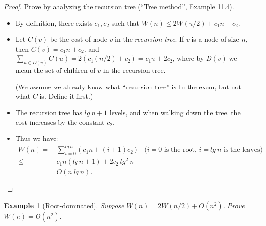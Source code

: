 \documentclass[11pt,a4paper,oneside,microtype,nokorean]{oblivoir}
\newtheorem{example}{Example}
\begin{document}
\begin{proof}
  Prove by analyzing the recursion tree (``Tree method'', Example 11.4).

  \begin{itemize}
  \item By definition, there exists $c_1,c_2$ such that $W(n) \le 2W(n/2) + c_1 n + c_2.$
  \item Let $C(v)$ be the cost of node $v$ in the \emph{recursion tree}.  If $v$ is a node of size
    $n$, then $C(v) = c_1 n + c_2$, and
    $\sum_{u \in D(v)} C(u) = 2(c_1 (n/2) + c_2) = c_1 n + 2 c_2$, where by $D(v)$ we mean the set
    of children of $v$ in the recursion tree.

    (We assume we already know what ``recursion tree'' is In the exam, but not what $C$ is.  Define
    it first.)
  \item The recursion tree has $lg~n + 1$ levels, and when walking down the tree, the cost increases
    by the constant $c_2$.
  \item Thus we have:
    \begin{align*}
      W(n)
      = &~ \sum_{i=0}^{lg~n} (c_1 n + (i+1) c_2) & \mbox{($i=0$ is the root, $i=lg~n$ is the
                                                   leaves)} \\
      \le &~ c_1 n (lg~n + 1) + 2 c_2~lg^2~n \\
      = &~ O(n~lg~n).
    \end{align*}
  \end{itemize}
\end{proof}


\begin{example}[Root-dominated] Suppose $W(n) = 2W(n/2) + O(n^2)$.  Prove $W(n) = O(n^2)$.
\end{example}
\end{document}
